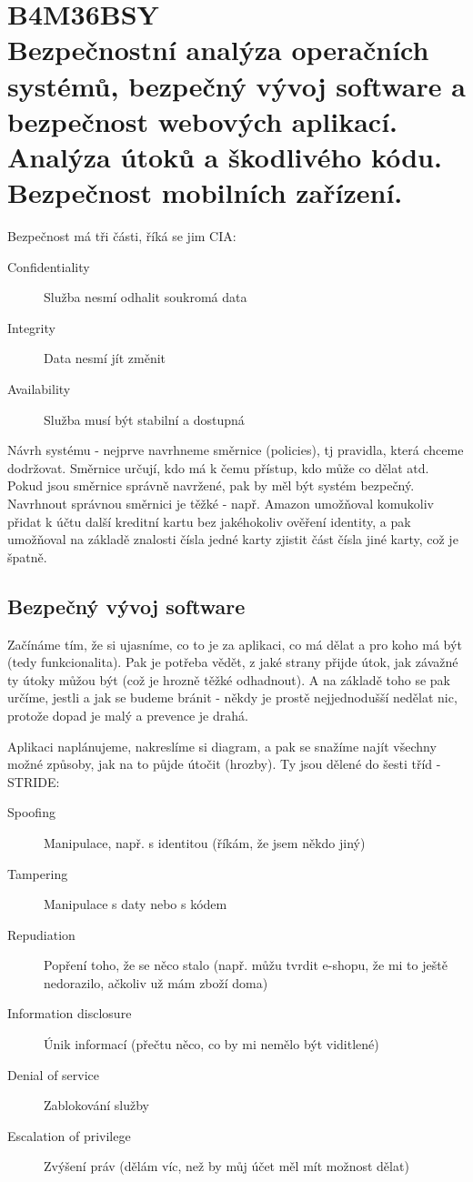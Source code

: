 \chapter[Bezpečnost systémů]{B4M36BSY \\[1ex]\Large{Bezpečnostní analýza operačních systémů, bezpečný vývoj software a bezpečnost webových aplikací. Analýza útoků a škodlivého kódu. Bezpečnost mobilních zařízení.}}

Bezpečnost má tři části, říká se jim CIA:
\begin{description}
\item[Confidentiality] Služba nesmí odhalit soukromá data
\item[Integrity] Data nesmí jít změnit 
\item[Availability] Služba musí být stabilní a dostupná
\end{description}

Návrh systému - nejprve navrhneme směrnice (policies), tj pravidla, která chceme dodržovat. Směrnice určují, kdo má k čemu přístup, kdo může co dělat atd. Pokud jsou směrnice správně navržené, pak by měl být systém bezpečný. Navrhnout správnou směrnici je těžké - např. Amazon umožňoval komukoliv přidat k účtu další kreditní kartu bez jakéhokoliv ověření identity, a pak umožňoval na základě znalosti čísla jedné karty zjistit část čísla jiné karty, což je špatně.




\section{Bezpečný vývoj software}

Začínáme tím, že si ujasníme, co to je za aplikaci, co má dělat a pro koho má být (tedy funkcionalita). Pak je potřeba vědět, z jaké strany přijde útok, jak závažné ty útoky můžou být (což je hrozně těžké odhadnout). A na základě toho se pak určíme, jestli a jak se budeme bránit - někdy je prostě nejjednodušší nedělat nic, protože dopad je malý a prevence je drahá.

Aplikaci naplánujeme, nakreslíme si diagram, a pak se snažíme najít všechny možné způsoby, jak na to půjde útočit (hrozby). Ty jsou dělené do šesti tříd - STRIDE:
\begin{description}
\item[Spoofing] Manipulace, např. s identitou (říkám, že jsem někdo jiný)
\item[Tampering] Manipulace s daty nebo s kódem
\item[Repudiation] Popření toho, že se něco stalo (např. můžu tvrdit e-shopu, že mi to ještě nedorazilo, ačkoliv už mám zboží doma)
\item[Information disclosure] Únik informací (přečtu něco, co by mi nemělo být viditlené)
\item[Denial of service] Zablokování služby
\item[Escalation of privilege] Zvýšení práv (dělám víc, než by můj účet měl mít možnost dělat)
\end{description}

